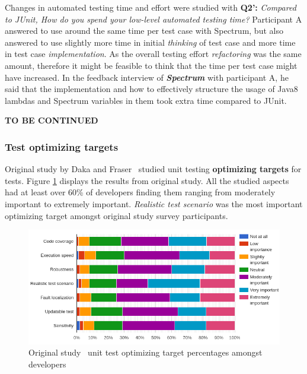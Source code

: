 Changes in automated testing time and effort were studied with \textbf{Q2':} \textit{Compared to JUnit, How do you spend your low-level automated testing time?}
Participant A answered
to use around the same time per test case with Spectrum, but also answered to use slightly more time in initial \textit{thinking} of test
case and more time in test case \textit{implementation}. As the overall testing effort \textit{refactoring} was the same amount, therefore it might
be feasible to think that the time per test case might have increased. In the feedback interview of \textbf{\textit{Spectrum}} with participant
A, he said that the implementation and how to effectively structure the usage of Java8 lambdas and Spectrum variables
in them took extra time compared to JUnit.

\textbf{TO BE CONTINUED}
\clearpage

\subsubsection{Test optimizing targets}
Original study by Daka and Fraser~\cite{daka2014survey} studied unit testing \textbf{optimizing targets} for tests. Figure \ref{fig:org-optimize}
displays the results from original study. All the studied aspects had at least over 60\% of developers finding them ranging
from moderately important to extremely important. \textit{Realistic test scenario} was the most important optimizing target
amongst original study survey participants.

    \begin{figure}[ht]
      \begin{center}
        \includegraphics[width=14.7cm]{images/optimize-org.png}
        \caption{Original study~\cite{daka2014survey} unit test optimizing target percentages amongst developers}
        \label{fig:org-optimize}
      \end{center}
    \end{figure}

